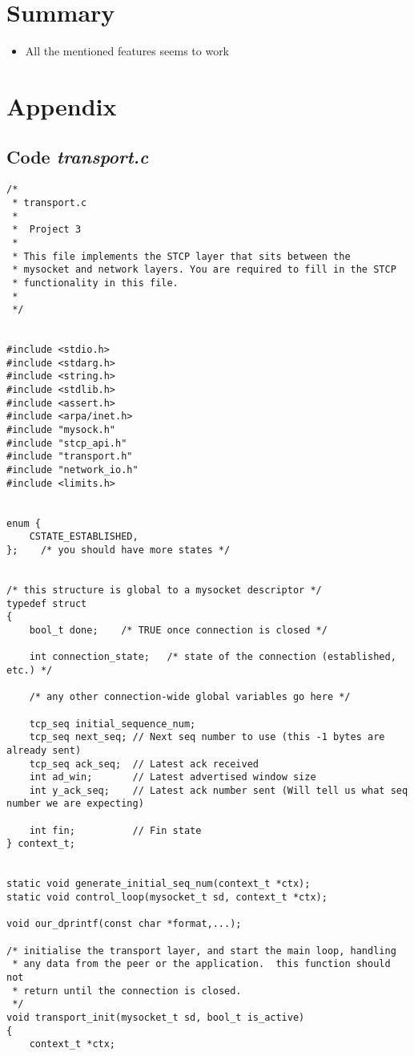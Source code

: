 \documentclass[11pt,a4paper,titlepage]{article}
\begin{document}
\section{Summary}
\begin{itemize}
\item All the mentioned features seems to work
\end{itemize}

\section{Appendix}
\subsection{Code \textit{transport.c}}
 
\begin{lstlisting}
/*
 * transport.c 
 *
 *	Project 3		
 *
 * This file implements the STCP layer that sits between the
 * mysocket and network layers. You are required to fill in the STCP
 * functionality in this file. 
 *
 */


#include <stdio.h>
#include <stdarg.h>
#include <string.h>
#include <stdlib.h>
#include <assert.h>
#include <arpa/inet.h>
#include "mysock.h"
#include "stcp_api.h"
#include "transport.h"
#include "network_io.h"
#include <limits.h>


enum { 
	CSTATE_ESTABLISHED, 
};    /* you should have more states */


/* this structure is global to a mysocket descriptor */
typedef struct
{
    bool_t done;    /* TRUE once connection is closed */

    int connection_state;   /* state of the connection (established, etc.) */

    /* any other connection-wide global variables go here */

    tcp_seq initial_sequence_num;
	tcp_seq next_seq; // Next seq number to use (this -1 bytes are already sent)
	tcp_seq ack_seq;  // Latest ack received
	int	ad_win;		  // Latest advertised window size
	int y_ack_seq;	  // Latest ack number sent (Will tell us what seq number we are expecting)

	int fin;		  // Fin state
} context_t;


static void generate_initial_seq_num(context_t *ctx);
static void control_loop(mysocket_t sd, context_t *ctx);

void our_dprintf(const char *format,...);

/* initialise the transport layer, and start the main loop, handling
 * any data from the peer or the application.  this function should not
 * return until the connection is closed.
 */
void transport_init(mysocket_t sd, bool_t is_active)
{
    context_t *ctx;


\end{lstlisting}
\end{document}
